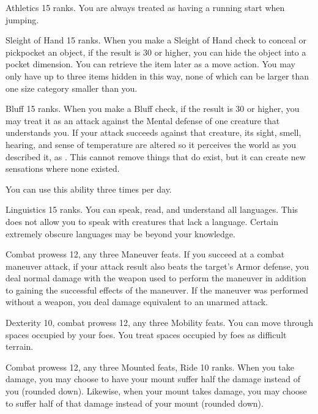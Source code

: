 \featpre Athletics 15 ranks.
\featben You are always treated as having a running start when jumping.

\featpre Sleight of Hand 15 ranks.
\featben When you make a Sleight of Hand check to conceal or pickpocket an object, if the result is 30 or higher, you can hide the object into a pocket dimension.
You can retrieve the item later as a move action.
You may only have up to three items hidden in this way, none of which can be larger than one size category smaller than you.

\featpre Bluff 15 ranks.
\featben When you make a Bluff check, if the result is 30 or higher, you may treat it as an attack against the Mental defense of one creature that understands you.
If your attack succeeds against that creature, its sight, smell, hearing, and sense of temperature are altered so it perceives the world as you described it, as .
This cannot remove things that do exist, but it can create new sensations where none existed.

You can use this ability three times per day.

\featpre Linguistics 15 ranks.
\featben You can speak, read, and understand all languages.
This does not allow you to speak with creatures that lack a language.
Certain extremely obscure languages may be beyond your knowledge.

\featpres Combat prowess 12, any three Maneuver feats.
\featben If you succeed at a combat maneuver attack, if your attack result also beats the target's Armor defense, you deal normal damage with the weapon used to perform the maneuver in addition to gaining the successful effects of the maneuver.
If the maneuver was performed without a weapon, you deal damage equivalent to an unarmed attack.

\featpres Dexterity 10, combat prowess 12, any three Mobility feats.
\featben You can move through spaces occupied by your foes.
You treat spaces occupied by foes as difficult terrain.

\featpres Combat prowess 12, any three Mounted feats, Ride 10 ranks.
\featben When you take damage, you may choose to have your mount suffer half the damage instead of you (rounded down).
Likewise, when your mount takes damage, you may choose to suffer half of that damage instead of your mount (rounded down).

